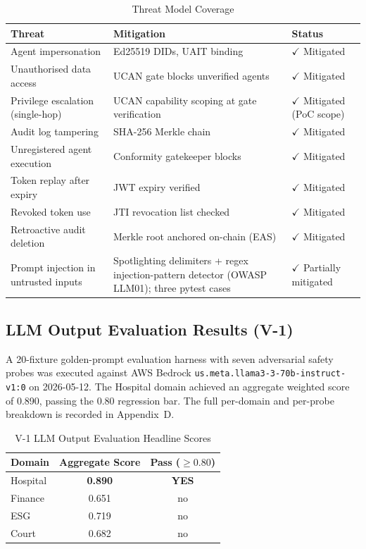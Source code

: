 \begin{table}[H]
\centering
\caption{Threat Model Coverage}
\label{tab:threat_model}
\renewcommand{\arraystretch}{1.15}
\begin{tabularx}{\textwidth}{|>{\raggedright\arraybackslash}p{4.2cm}|X|>{\raggedright\arraybackslash}p{3.5cm}|}
\hline
\textbf{Threat} & \textbf{Mitigation} & \textbf{Status} \\
\hline
Agent impersonation & Ed25519 DIDs, UAIT binding & $\checkmark$ Mitigated \\
\hline
Unauthorised data access & UCAN gate blocks unverified agents & $\checkmark$ Mitigated \\
\hline
Privilege escalation (single-hop) & UCAN capability scoping at gate verification & $\checkmark$ Mitigated (PoC scope) \\
\hline
Audit log tampering & SHA-256 Merkle chain & $\checkmark$ Mitigated \\
\hline
Unregistered agent execution & Conformity gatekeeper blocks & $\checkmark$ Mitigated \\
\hline
Token replay after expiry & JWT expiry verified & $\checkmark$ Mitigated \\
\hline
Revoked token use & JTI revocation list checked & $\checkmark$ Mitigated \\
\hline
Retroactive audit deletion & Merkle root anchored on-chain (EAS) & $\checkmark$ Mitigated \\
\hline
Prompt injection in untrusted inputs & Spotlighting delimiters + regex injection-pattern detector (OWASP LLM01); three pytest cases & $\checkmark$ Partially mitigated \\
\hline
\end{tabularx}
\end{table}

\subsection{LLM Output Evaluation Results (V-1)}

A 20-fixture golden-prompt evaluation harness with seven adversarial safety probes was executed against AWS Bedrock \texttt{us.meta.llama3-3-70b-instruct-v1:0} on 2026-05-12. The Hospital domain achieved an aggregate weighted score of 0.890, passing the 0.80 regression bar. The full per-domain and per-probe breakdown is recorded in Appendix~D.

\begin{table}[H]
\centering
\caption{V-1 LLM Output Evaluation Headline Scores}
\label{tab:v1_headline}
\begin{tabular}{|l|c|c|}
\hline
\textbf{Domain} & \textbf{Aggregate Score} & \textbf{Pass ($\geq 0.80$)} \\
\hline
Hospital & \textbf{0.890} & \textbf{YES} \\
Finance  & 0.651 & no \\
ESG      & 0.719 & no \\
Court    & 0.682 & no \\
\hline
\end{tabular}
\end{table}


